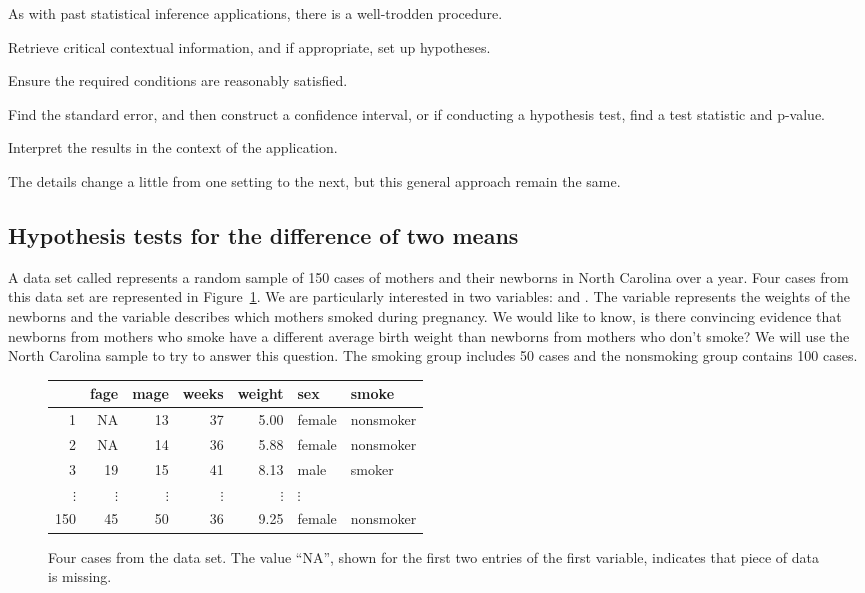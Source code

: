 
\noindent%
As with past statistical inference applications,
there is a well-trodden procedure.
\begin{description}
\setlength{\itemsep}{0mm}
\item[Prepare.]
    Retrieve critical contextual information,
    and if appropriate, set up hypotheses.
\item[Check.]
    Ensure the required conditions are reasonably
    satisfied.
\item[Calculate.]
    Find the standard error, and then construct
    a confidence interval, or if conducting
    a hypothesis test, find a test statistic
    and p-value.
\item[Conclude.]
    Interpret the results in the context of the
    application.
\end{description}
The details change a little from one setting to the next,
but this general approach remain the same.



\subsection{Hypothesis tests for the difference of two means}


A data set called  represents a random sample of 150 cases of mothers and their newborns in North Carolina over a year. Four cases from this data set are represented in Figure~\ref{babySmokeDF}. We are particularly interested in two variables:  and . The  variable represents the weights of the newborns and the  variable describes which mothers smoked during pregnancy. We would like to know, is there convincing evidence that newborns from mothers who smoke have a different average birth weight than newborns from mothers who don't smoke? We will use the North Carolina sample to try to answer this question. The smoking group includes 50 cases and the nonsmoking group contains 100 cases.

\begin{figure}[h]
\centering
\begin{tabular}{rrrrrll}
  \hline
 & fage & mage & weeks & weight & sex & smoke \\ 
  \hline
1 & NA & 13 &  37 & 5.00 & female & nonsmoker \\ 
  2 & NA & 14 &  36 & 5.88 & female & nonsmoker \\ 
  3 & 19 & 15 &  41 & 8.13 & male & smoker \\ 
  $\vdots$ &   $\vdots$ &   $\vdots$ &   $\vdots$ &   $\vdots$ &   $\vdots$ \\
  150 & 45 & 50 &  36 & 9.25 & female & nonsmoker \\ 
   \hline
\end{tabular}
\caption{Four cases from the  data set. The value ``NA'', shown for the first two entries of the first variable, indicates that piece of data is missing.}
\label{babySmokeDF}
\end{figure}


